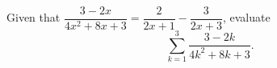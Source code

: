 Given that $\dfrac{3-2x}{4x^2+8x+3}=\dfrac{2}{2x+1}-\dfrac{3}{2x+3}$, evaluate
\[
\sum_{k=1}^{3}\dfrac{3-2k}{4k^2+8k+3}.
\]
